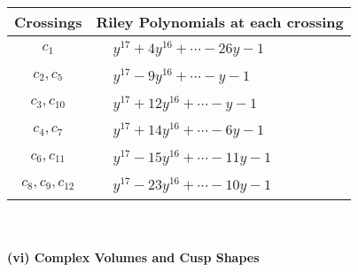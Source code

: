 \documentclass[1p]{elsarticle_modified}
\theoremstyle{definition}
\begin{document}
\begin{tabular}{m{50pt}|m{274pt}}
Crossings & \hspace{64pt}Riley Polynomials at each crossing \\
\hline $$\begin{aligned}c_{1}\end{aligned}$$&$\begin{aligned}
&y^{17}+4 y^{16}+\cdots-26 y-1
\end{aligned}$\\
\hline $$\begin{aligned}c_{2},c_{5}\end{aligned}$$&$\begin{aligned}
&y^{17}-9 y^{16}+\cdots- y-1
\end{aligned}$\\
\hline $$\begin{aligned}c_{3},c_{10}\end{aligned}$$&$\begin{aligned}
&y^{17}+12 y^{16}+\cdots- y-1
\end{aligned}$\\
\hline $$\begin{aligned}c_{4},c_{7}\end{aligned}$$&$\begin{aligned}
&y^{17}+14 y^{16}+\cdots-6 y-1
\end{aligned}$\\
\hline $$\begin{aligned}c_{6},c_{11}\end{aligned}$$&$\begin{aligned}
&y^{17}-15 y^{16}+\cdots-11 y-1
\end{aligned}$\\
\hline $$\begin{aligned}c_{8},c_{9},c_{12}\end{aligned}$$&$\begin{aligned}
&y^{17}-23 y^{16}+\cdots-10 y-1
\end{aligned}$\\
\hline
\end{tabular}\\~\\
\newpage\flushleft \textbf{(vi) Complex Volumes and Cusp Shapes}
\end{document}
